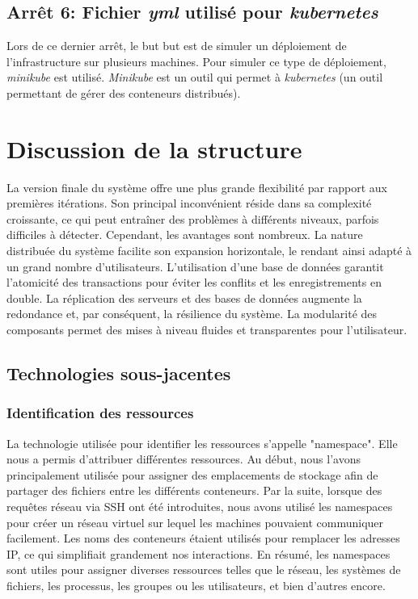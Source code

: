 \documentclass[a11paper, 11pt]{article}
\begin{document}
\subsection{Arrêt 6: Fichier \textit{yml} utilisé pour \textit{kubernetes}}

Lors de ce dernier arrêt, le but but est de simuler un déploiement de
l'infrastructure sur plusieurs machines. Pour simuler ce type de déploiement,
\textit{minikube} est utilisé. \textit{Minikube} est un outil qui permet à
\textit{kubernetes} (un outil permettant de gérer des conteneurs distribués).




\section{Discussion de la structure}

La version finale du système offre une plus grande flexibilité par rapport aux
premières itérations. Son principal inconvénient réside dans sa complexité
croissante, ce qui peut entraîner des problèmes à différents niveaux, parfois
difficiles à détecter. Cependant, les avantages sont nombreux. La nature
distribuée du système facilite son expansion horizontale, le rendant ainsi
adapté à un grand nombre d'utilisateurs. L'utilisation d'une base de données
garantit l'atomicité des transactions pour éviter les conflits et les
enregistrements en double. La réplication des serveurs et des bases de données
augmente la redondance et, par conséquent, la résilience du système. La
modularité des composants permet des mises à niveau fluides et transparentes
pour l'utilisateur.

\subsection{Technologies sous-jacentes}

\subsubsection{Identification des ressources}

La technologie utilisée pour identifier les ressources s'appelle "namespace".
Elle nous a permis d'attribuer différentes ressources. Au début, nous l'avons
principalement utilisée pour assigner des emplacements de stockage afin de
partager des fichiers entre les différents conteneurs. Par la suite, lorsque
des requêtes réseau via SSH ont été introduites, nous avons utilisé les
namespaces pour créer un réseau virtuel sur lequel les machines pouvaient
communiquer facilement. Les noms des conteneurs étaient utilisés pour remplacer
les adresses IP, ce qui simplifiait grandement nos interactions. En résumé, les
namespaces sont utiles pour assigner diverses ressources telles que le réseau,
les systèmes de fichiers, les processus, les groupes ou les utilisateurs, et
bien d'autres encore.
\end{document}
